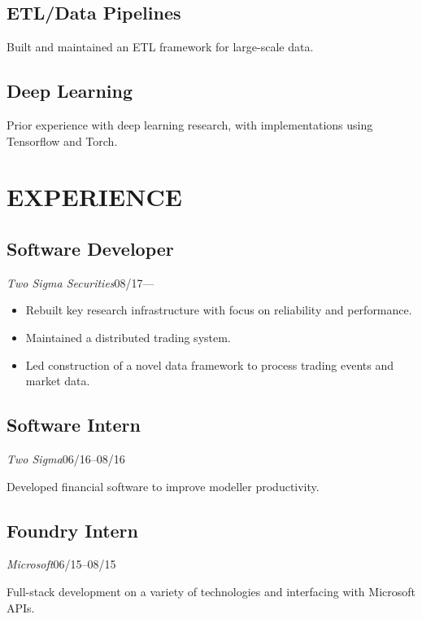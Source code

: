 \documentclass[11pt]{article}
\begin{document}
\begin{minipage}[t]{0.40\textwidth}
  \medskip
  \subsection*{ETL/Data Pipelines}
  Built and maintained an ETL framework for large-scale data.

  \medskip
  \subsection*{Deep Learning}
  Prior experience with deep learning research, with implementations using Tensorflow and Torch.


\end{minipage}\hspace{0.04\textwidth}
\begin{minipage}[t]{0.55\textwidth}
  \section*{\LARGE EXPERIENCE}

  \subsection*{Software Developer}
  \emph{Two Sigma Securities}\hfill08/17---
  \smallskip

  \begin{itemize}
    \item Rebuilt key research infrastructure with focus on reliability and performance.
    \item Maintained a distributed trading system.
    \item Led construction of a novel data framework to process trading events and market data.
  \end{itemize}

  \medskip
  \subsection*{Software Intern}
  \emph{Two Sigma}\hfill 06/16--08/16
  \smallskip

  Developed financial software to improve modeller productivity.

  \medskip
  \subsection*{Foundry Intern}
  \emph{Microsoft}\hfill 06/15--08/15
  \smallskip

  Full-stack development on a variety of technologies and interfacing with Microsoft APIs.


\end{minipage}
\end{document}
